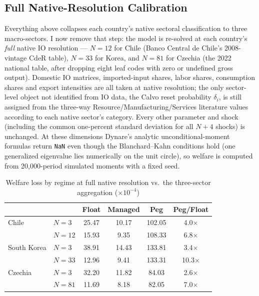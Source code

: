 \documentclass[12pt]{article}
\begin{document}
\subsection{Full Native-Resolution Calibration}
\label{sec:fullres}

Everything above collapses each country's native sectoral classification to three macro-sectors. I
now remove that step: the model is re-solved at each country's \emph{full} native IO resolution ---
$N=12$ for Chile (Banco Central de Chile's 2008-vintage CdeR table), $N=33$ for Korea, and $N=81$ for
Czechia (the 2022 national table, after dropping eight leaf codes with zero or undefined gross
output). Domestic IO matrices, imported-input shares, labor shares, consumption shares and export
intensities are all taken at native resolution; the only sector-level object not identified from IO
data, the Calvo reset probability $\delta_i$, is still assigned from the three-way
Resource/Manufacturing/Services literature values according to each native sector's category. Every
other parameter and shock (including the common one-percent standard deviation for all $N+4$ shocks)
is unchanged. At these dimensions Dynare's analytic unconditional-moment formulas return \texttt{NaN}
even though the Blanchard--Kahn conditions hold (one generalized eigenvalue lies numerically on the
unit circle), so welfare is computed from 20,000-period simulated moments with a fixed seed.

\begin{table}[H]
\centering
\caption{Welfare loss by regime at full native resolution vs.\ the three-sector aggregation
($\times10^{-4}$)}
\label{tab:fullres}
\begin{tabular}{llcccc}
\toprule
 & & Float & Managed & Peg & Peg/Float \\
\midrule
Chile & $N=3$ & 25.47 & 10.17 & 102.05 & 4.0$\times$ \\
      & $N=12$ & 15.93 & 9.35 & 108.33 & 6.8$\times$ \\
\addlinespace
South Korea & $N=3$ & 38.91 & 14.43 & 133.81 & 3.4$\times$ \\
      & $N=33$ & 12.96 & 9.41 & 133.31 & 10.3$\times$ \\
\addlinespace
Czechia & $N=3$ & 32.20 & 11.82 & 84.03 & 2.6$\times$ \\
      & $N=81$ & 11.69 & 8.18 & 82.05 & 7.0$\times$ \\
\bottomrule
\end{tabular}
\end{table}
\end{document}
